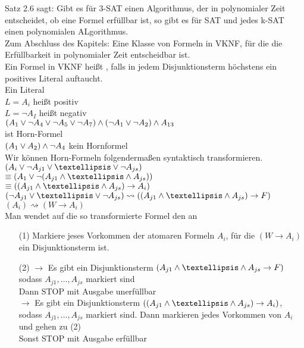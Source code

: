 Satz 2.6 sagt: Gibt es für 3-SAT einen Algorithmus, der in polynomialer Zeit entscheidet, ob eine Formel erfüllbar ist, so gibt es für SAT und jedes k-SAT einen polynomialen ALgorithmus.\\

Zum Abschluss des Kapitels: Eine Klasse von Formeln in VKNF, für die die Erfüllbarkeit in polynomialer Zeit entscheidbar ist.\\

Ein Formel in VKNF heißt , falls in jedem Disjunktionsterm höchstens ein positives Literal auftaucht.\\

Ein Literal\\
$L = A_i$ heißt positiv\\
$L = \neg A_I$ heißt negativ\\

\beispiel{}
$(A_1 \vee \neg A_4 \vee \neg A_5 \vee \neg A_7) \wedge (\neg A_1 \vee \neg A_2) \wedge A_{13}$\\
ist Horn-Formel\\

$(A_1 \vee A_2) \wedge \neg A_4$ kein Hornformel\\

Wir können Horn-Formeln folgendermaßen syntaktisch transformieren.\\

$(A_i \OR \neg A_{j1} \OR … \OR \neg A_{js})$\\
$\equiv (A_1 \OR \neg (A_{j1} \AND … \AND A_{js} ))$\\
$\equiv ((A_{j1} \AND … \AND A_{js} ) \rightarrow A_i )$\\

$(\neg A_{j1} \OR … \OR \neg A_{js} ) \rightsquigarrow ((A_{j1} \AND … \AND A_{js}) \rightarrow F)$\\
$(A_i) \rightsquigarrow (W \rightarrow A_i)$\\

Man wendet auf die so transformierte Formel den  an
\begin{enumerate}
\item[(1)] Markiere jeses Vorkommen der atomaren Formeln $A_i$, für die $(W \rightarrow A_i)$ ein Disjunktionsterm ist.

\item[(2)] $\rightarrow$ Es gibt ein Disjunktionsterm $(A_{j1} \AND … \AND A_{js} \rightarrow F)$\\
sodass $A_{j1}, …, A_{js}$ markiert sind\\
Dann STOP mit Ausgabe unerfüllbar\\
$\rightarrow$ Es gibt ein Disjunktionsterm $((A_{j1} \AND … \AND A_{js}) \rightarrow A_i)$, sodass $A_{j1}, …, A_{js}$ markiert sind. Dann markieren jedes Vorkommen von $A_i$ und gehen zu (2)\\
Sonst STOP mit Ausgabe erfüllbar
\end{enumerate}

